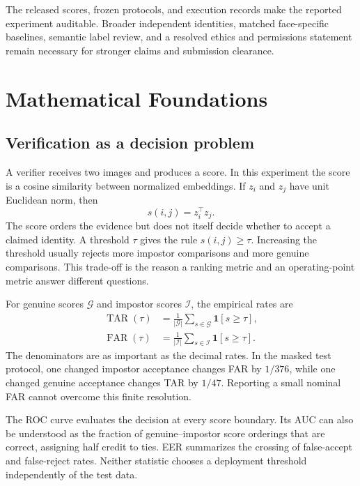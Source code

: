 \documentclass[12pt,a4paper,oneside]{report}
\newcommand{\TAR}{\operatorname{TAR}}
\newcommand{\FAR}{\operatorname{FAR}}
\begin{document}
The released scores, frozen protocols, and execution records make the reported experiment auditable. Broader independent identities, matched face-specific baselines, semantic label review, and a resolved ethics and permissions statement remain necessary for stronger claims and submission clearance.



\appendix
\chapter{Mathematical Foundations}
\section{Verification as a decision problem}
A verifier receives two images and produces a score. In this experiment the score is a cosine similarity between normalized embeddings. If $z_i$ and $z_j$ have unit Euclidean norm, then
\begin{equation}
s(i,j)=z_i^{\top}z_j.
\end{equation}
The score orders the evidence but does not itself decide whether to accept a claimed identity. A threshold $\tau$ gives the rule $s(i,j)\geq\tau$. Increasing the threshold usually rejects more impostor comparisons and more genuine comparisons. This trade-off is the reason a ranking metric and an operating-point metric answer different questions.

For genuine scores $\mathcal G$ and impostor scores $\mathcal I$, the empirical rates are
\begin{align}
\TAR(\tau)&=\frac{1}{|\mathcal G|}\sum_{s\in\mathcal G}\mathbf 1[s\geq\tau],\\
\FAR(\tau)&=\frac{1}{|\mathcal I|}\sum_{s\in\mathcal I}\mathbf 1[s\geq\tau].
\end{align}
The denominators are as important as the decimal rates. In the masked test protocol, one changed impostor acceptance changes FAR by $1/376$, while one changed genuine acceptance changes TAR by $1/47$. Reporting a small nominal FAR cannot overcome this finite resolution.

The ROC curve evaluates the decision at every score boundary. Its AUC can also be understood as the fraction of genuine--impostor score orderings that are correct, assigning half credit to ties. EER summarizes the crossing of false-accept and false-reject rates. Neither statistic chooses a deployment threshold independently of the test data.
\end{document}
